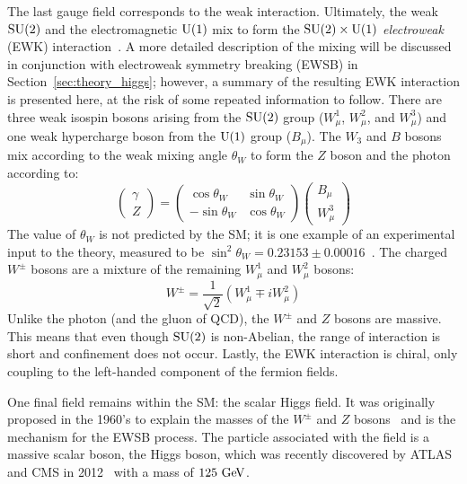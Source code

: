 The last gauge field corresponds to the weak interaction.
Ultimately, the weak $\textrm{SU}(2)$ and the electromagnetic $\textrm{U}(1)$ mix to form the $\textrm{SU}(2)\times\textrm{U}(1)$ \emph{electroweak} (EWK) interaction~\cite{1959.Salam.electroweak, 1959.Glashow.vector-mesons}.
A more detailed description of the mixing will be discussed in conjunction with electroweak symmetry breaking (EWSB) in Section~\ref{sec:theory_higgs}; however, a summary of the resulting EWK interaction is presented here, at the risk of some repeated information to follow.
There are three weak isospin bosons arising from the $\textrm{SU}(2)$ group ($W_{\mu}^1$, $W_{\mu}^2$, and $W_{\mu}^3$) and one weak hypercharge boson from the $\textrm{U}(1)$ group ($B_{\mu}$).
The $W_3$ and $B$ bosons mix according to the weak mixing angle $\theta_W$ to form the $Z$ boson and the photon according to:
\begin{equation}
  \begin{pmatrix}
  \gamma\\
  Z
  \end{pmatrix}
  = 
  \begin{pmatrix}
  \cos{\theta_W} & \sin{\theta_W} \\
  -\sin{\theta_W} & \cos{\theta_W}
  \end{pmatrix}
  \begin{pmatrix}
  B_{\mu} \\
  W_{\mu}^3
  \end{pmatrix}
  \label{eq:weak_mixing}
\end{equation}
The value of $\theta_W$ is not predicted by the SM; it is one example of an experimental input to the theory, measured to be $\sin^2{\theta_W} = 0.23153\pm0.00016$~\cite{2006.weak-mixing}.
The charged $W^{\pm}$ bosons are a mixture of the remaining $W_{\mu}^1$ and $W_{\mu}^2$ bosons:
\begin{equation}
  W^{\pm} = \frac{1}{\sqrt{2}}(W_{\mu}^1 \mp iW_{\mu}^2)
  \label{eq:w_mixing}
\end{equation}
Unlike the photon (and the gluon of QCD), the $W^\pm$ and $Z$ bosons are massive.
This means that even though $\textrm{SU}(2)$ is non-Abelian, the range of interaction is short and confinement does not occur.
Lastly, the EWK interaction is chiral, only coupling to the left-handed component of the fermion fields.

One final field remains within the SM: the scalar Higgs field.
It was originally proposed in the 1960's to explain the masses of the $W^{\pm}$ and $Z$ bosons~\cite{1964.Englert.symmetry_breaking, 1964.Higgs.Broken_Symmetries_1, 1964.Higgs.Broken_Symmetries_2} and is the mechanism for the EWSB process.
The particle associated with the field is a massive scalar boson, the Higgs boson, which was recently discovered by ATLAS and CMS in 2012~\cite{HIGG-2012-27, CMS-HIG-12-028} with a mass of $125\gev$.


